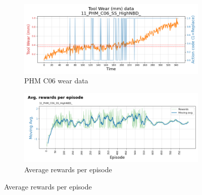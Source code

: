 \documentclass[a4paper, 12pt]{article}
\begin{document}
\begin{figure}[h]
	\begin{subfigure}[b]{0.5\textwidth}
		\centering
		\includegraphics[width=\textwidth]{images/TrainingPlots/11_PHM_C06_SS_HighNBD__wear_plot.png}  
		\caption{PHM C06 wear data}
		\label{fig:C06wear}
	\end{subfigure}
	\hfill
	\begin{subfigure}[b]{0.5\textwidth}
		\centering
		\includegraphics[width=\textwidth]{images/TrainingPlots/11_PHM_C06_SS_HighNBD__Avg_episode_rewards.png}  
		\caption{Average rewards per episode}
		\label{fig:C06rewards}
	\end{subfigure} \par\bigskip
	

\end{figure}
\end{document}
